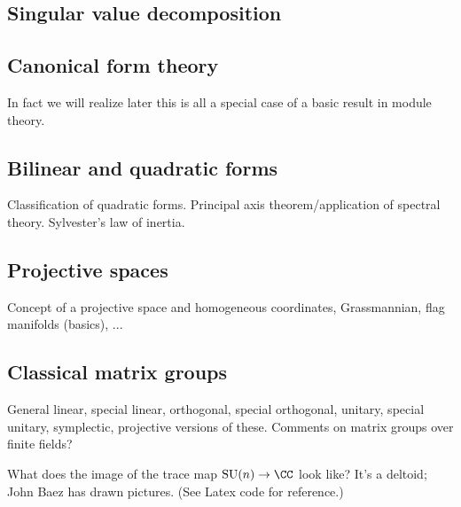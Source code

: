 \subsection{Singular value decomposition}

\subsection{Canonical form theory}

\begin{remark}
In fact we will realize later this is all a special case of a basic result in module theory.
\end{remark}

\subsection{Bilinear and quadratic forms}

Classification of quadratic forms. Principal axis theorem/application of spectral theory. Sylvester's law of inertia.

\subsection{Projective spaces}

Concept of a projective space and homogeneous coordinates, Grassmannian, flag manifolds (basics), ...

\subsection{Classical matrix groups}

General linear, special linear, orthogonal, special orthogonal, unitary, special unitary, symplectic, projective versions of these. Comments on matrix groups over finite fields?

\begin{example}
What does the image of the trace map $\mathrm{SU}(n) \to \CC$ look like? It's a deltoid; John Baez has drawn pictures. (See Latex code for reference.)
\end{example}